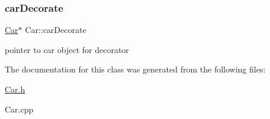 \subsubsection{\texorpdfstring{car\+Decorate}{carDecorate}}
{\footnotesize\ttfamily \mbox{\hyperlink{class_car}{Car}}$\ast$ Car\+::car\+Decorate}

pointer to car object for decorator 

The documentation for this class was generated from the following files\+:\begin{DoxyCompactItemize}
\item 
\mbox{\hyperlink{_car_8h}{Car.\+h}}\item 
Car.\+cpp\end{DoxyCompactItemize}
